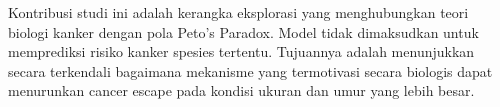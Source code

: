 Kontribusi studi ini adalah kerangka eksplorasi yang menghubungkan teori
biologi kanker dengan pola Peto's Paradox. Model tidak dimaksudkan untuk
memprediksi risiko kanker spesies tertentu. Tujuannya adalah menunjukkan secara
terkendali bagaimana mekanisme yang termotivasi secara biologis dapat
menurunkan cancer escape pada kondisi ukuran dan umur yang lebih besar.
